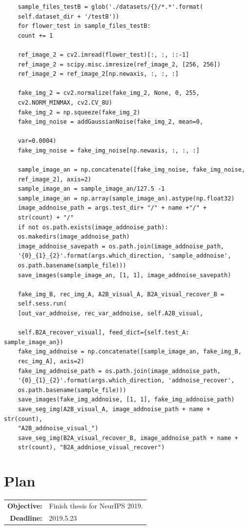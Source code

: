 \documentclass[a4paper]{article}
\begin{document}
	\lstset{language=python}
	\begin{lstlisting}
	sample_files_testB = glob('./datasets/{}/*.*'.format(
	self.dataset_dir + '/testB'))
	for flower_test in sample_files_testB:
	count += 1
	
	ref_image_2 = cv2.imread(flower_test)[:, :, ::-1]
	ref_image_2 = scipy.misc.imresize(ref_image_2, [256, 256])
	ref_image_2 = ref_image_2[np.newaxis, :, :, :]
	
	fake_img_2 = cv2.normalize(fake_img_2, None, 0, 255, 
	cv2.NORM_MINMAX, cv2.CV_8U)
	fake_img_2 = np.squeeze(fake_img_2)
	fake_img_noise = addGaussianNoise(fake_img_2, mean=0, 
	
	var=0.0004)
	fake_img_noise = fake_img_noise[np.newaxis, :, :, :]
	
	sample_image_an = np.concatenate([fake_img_noise, fake_img_noise, 
	ref_image_2], axis=2) 
	sample_image_an = sample_image_an/127.5 -1
	sample_image_an = np.array(sample_image_an).astype(np.float32)
	image_addnoise_path = args.test_dir+ "/" + name +"/" + 
	str(count) + "/"
	if not os.path.exists(image_addnoise_path):
	os.makedirs(image_addnoise_path)
	image_addnoise_savepath = os.path.join(image_addnoise_path,
	'{0}_{1}_{2}'.format(args.which_direction, 'sample_addnoise',
	os.path.basename(sample_file)))
	save_images(sample_image_an, [1, 1], image_addnoise_savepath)
	
	fake_img_B, rec_img_A, A2B_visual_A, B2A_visual_recover_B = 
	self.sess.run(
	[out_var_addnoise, rec_var_addnoise, self.A2B_visual, 
	
	self.B2A_recover_visual], feed_dict={self.test_A: sample_image_an})
	fake_img_addnoise = np.concatenate([sample_image_an, fake_img_B, 
	rec_img_A], axis=2)
	fake_img_addnoise_path = os.path.join(image_addnoise_path,  
	'{0}_{1}_{2}'.format(args.which_direction, 'addnoise_recover',
	os.path.basename(sample_file)))
	save_images(fake_img_addnoise, [1, 1], fake_img_addnoise_path)
	save_seg_img(A2B_visual_A, image_addnoise_path + name + str(count), 
	"A2B_addnoise_visual_") 
	save_seg_img(B2A_visual_recover_B, image_addnoise_path + name + 
	str(count), "B2A_addniose_visual_recover")  
	\end{lstlisting}\label{g2}
	
	\section{Plan}
	
	\begin{tabular}{rl}
		\textbf{Objective:} & Finish thesis for NeurIPS 2019.\\
		\textbf{Deadline:} & 2019.5.23
	\end{tabular}
	
\end{document}
